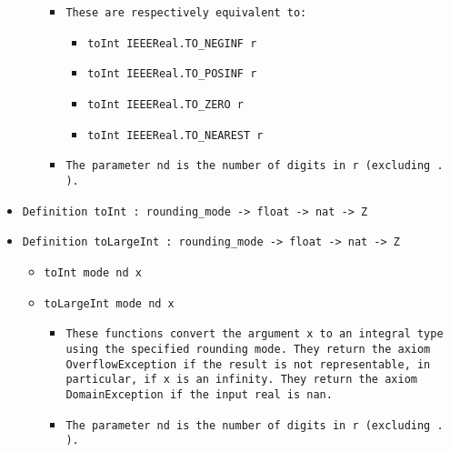 \documentclass[11pt]{report}
\begin{document}
\begin{itemize}
\begin{itemize}
\begin{itemize}
\item   \texttt{These are respectively equivalent to:}

\begin{itemize}

\item  \texttt{toInt IEEEReal.TO\_NEGINF r}

\item  \texttt{toInt IEEEReal.TO\_POSINF r}

\item  \texttt{toInt IEEEReal.TO\_ZERO r}

\item  \texttt{toInt IEEEReal.TO\_NEAREST r}

\end{itemize}

\item  \texttt{The parameter nd is the number of digits in r (excluding . ).}

\end{itemize}

\end{itemize}

\item  \texttt{Definition toInt : rounding\_mode -> float -> nat -> Z}

\item  \texttt{Definition toLargeInt : rounding\_mode -> float -> nat -> Z}

\begin{itemize}
\item  \texttt{toInt mode nd x}

\item  \texttt{toLargeInt mode nd x}

\begin{itemize}
\item  \begin{flushleft} \texttt{These functions convert the argument x to an integral type using the specified rounding mode. They return the axiom OverflowException if the result is not representable, in particular, if x is an infinity. They return the axiom DomainException if the input real is nan.} \end{flushleft}

\item  \texttt{The parameter nd is the number of digits in r (excluding . ).}

\end{itemize}

\end{itemize}


\end{itemize}
\end{document}
